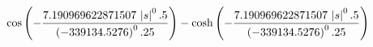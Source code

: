 $$\cos \left(-{{7.190969622871507\,\left| s\right| ^0.5}\over{\left(-
 339134.5276\right)^0.25}}\right)-\cosh \left(-{{7.190969622871507\,
 \left| s\right| ^0.5}\over{\left(-339134.5276\right)^0.25}}\right)$$
